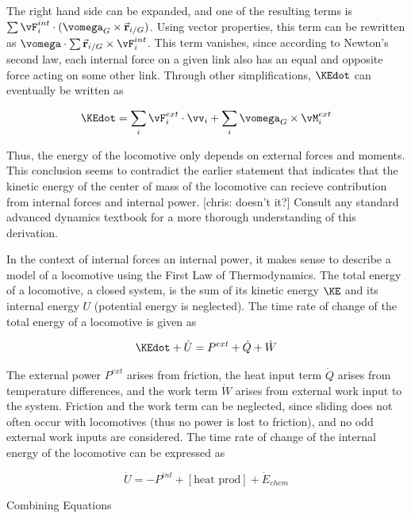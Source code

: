 The right hand side can be expanded, and one of the resulting terms is $\sum \vF_{i}^{int} \cdot (\vomega_{G} \times \vec{\mathbf{r}}_{i/G})$. Using vector properties, this term can be rewritten as $\vomega \cdot \sum \vec{\mathbf{r}}_{i/G} \times \vF_{i}^{int}$. This term vanishes, since according to Newton's second law, each internal force on a given link also has an equal and opposite force acting on some other link. Through other simplifications, $\KEdot$ can eventually be written as

\begin{equation}
\KEdot = \sum_{i} \vF_{i}^{ext} \cdot \vv_{i} + \sum_{i} \vomega_{G} \times \vM_{i}^{ext}
\end{equation}

Thus, the energy of the locomotive only depends on external forces and moments. This conclusion seems to contradict the earlier statement that indicates that the kinetic energy of the center of mass of the locomotive can recieve contribution from internal forces and internal power. [chris: doesn't it?] Consult any standard advanced dynamics textbook for a more thorough understanding of this derivation.

In the context of internal forces an internal power, it makes sense to describe a model of a locomotive using the First Law of Thermodynamics. The total energy of a locomotive, a closed system, is the sum of its kinetic energy $\KE$ and its internal energy $U$ (potential energy is neglected). The time rate of change of the total energy of a locomotive is given as

\begin{equation}
\KEdot + \dot{U} = P^{ext} + \dot{Q} + \dot{W}
\end{equation}


The external power $P^{ext}$ arises from friction, the heat input term $\dot{Q}$ arises from temperature differences, and the work term $\dot{W}$ arises from external work input to the system. Friction and the work term can be neglected, since sliding does not often occur with locomotives (thus no power is lost to friction), and no odd external work inputs are considered. The time rate of change of the internal energy of the locomotive can be expressed as

\begin{equation}
\dot{U} = -P^{int} + [\mbox{heat prod}] + \dot{E}_{chem}
\end{equation}

Combining Equations

